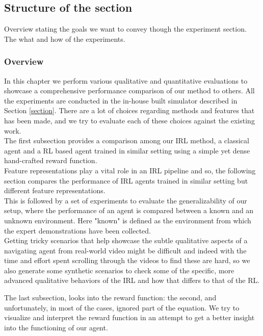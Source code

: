 \subsection{Structure of the section}
Overview stating the goals we want to convey though the experiment section. The what and how of the experiments.
\subsubsection*{Overview}
In this chapter we perform various qualitative and quantitative evaluations to showcase a comprehensive performance comparison of our method to others. All the experiments are conducted in the in-house built simulator described in Section \ref{section}. There are a lot of choices regarding methods and features that has been made, and we try to evaluate each of these choices against the existing work.\\
The first subsection provides a comparison among our IRL method, a classical agent and a RL based agent trained in similar setting using a simple yet dense hand-crafted reward function.\\
 Feature representations play a vital role in an IRL pipeline and so, the following section compares the performance of IRL agents trained in similar setting but different feature representations.\\
This is followed by a set of experiments to evaluate the generalizability of our setup, where the performance of an agent is compared between a known and an unknown environment. Here "known" is defined as the environment from which the expert demonstrations have been collected.\\

Getting tricky scenarios that help showcase the subtle qualitative aspects of a navigating agent from real-world video might be difficult and indeed with the time and effort spent scrolling through the videos to find these are hard, so we also generate some synthetic scenarios to check some of the specific, more advanced qualitative behaviors of the IRL and how that differs to that of the RL.

The last subsection, looks into the reward function: the second, and unfortunately, in most of the cases, ignored part of the equation. We try to visualize and interpret the reward function in an attempt to get a better insight into the functioning of our agent.

